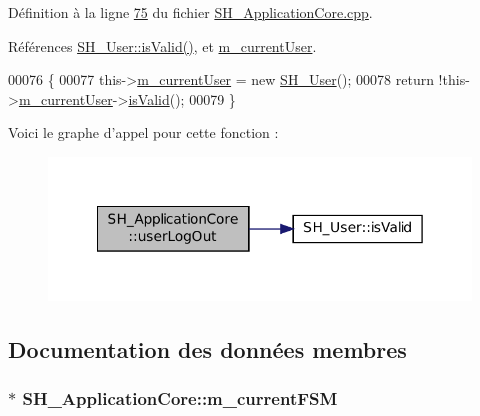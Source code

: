Définition à la ligne \hyperlink{SH__ApplicationCore_8cpp_source_l00075}{75} du fichier \hyperlink{SH__ApplicationCore_8cpp_source}{S\-H\-\_\-\-Application\-Core.\-cpp}.



Références \hyperlink{classSH__User_aa1b7fd66632c13905f3b6fd941505c02}{S\-H\-\_\-\-User\-::is\-Valid()}, et \hyperlink{classSH__ApplicationCore_aa61720acee7e06e9828c570e8190304a}{m\-\_\-current\-User}.


\begin{DoxyCode}
00076 \{
00077     this->\hyperlink{classSH__ApplicationCore_aa61720acee7e06e9828c570e8190304a}{m\_currentUser} = \textcolor{keyword}{new} \hyperlink{classSH__User}{SH\_User}();
00078     \textcolor{keywordflow}{return} !this->\hyperlink{classSH__ApplicationCore_aa61720acee7e06e9828c570e8190304a}{m\_currentUser}->\hyperlink{classSH__User_aa1b7fd66632c13905f3b6fd941505c02}{isValid}();
00079 \}
\end{DoxyCode}


Voici le graphe d'appel pour cette fonction \-:\nopagebreak
\begin{figure}[H]
\begin{center}
\leavevmode
\includegraphics[width=342pt]{classSH__ApplicationCore_abe6683bdada7ecf979b74656748be106_cgraph}
\end{center}
\end{figure}




\subsection{Documentation des données membres}
\hypertarget{classSH__ApplicationCore_a1088f3ba13abb8b3989cc0c325524232}{
\subsubsection[{m\-\_\-current\-F\-S\-M}]{$\ast$ S\-H\-\_\-\-Application\-Core\-::m\-\_\-current\-F\-S\-M\hspace{0.3cm}{\ttfamily [private]}}}\label{classSH__ApplicationCore_a1088f3ba13abb8b3989cc0c325524232}


